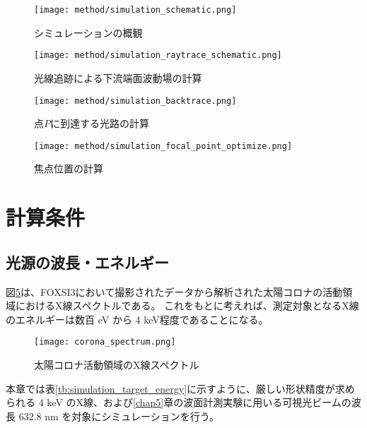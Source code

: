 \begin{figure}[h]
\centering
\texttt{[image: method/simulation\_schematic.png]}
\caption{シミュレーションの概観}
\label{fig:simulation_schematic}
\end{figure}


\begin{figure}[h]
\centering
\texttt{[image: method/simulation\_raytrace\_schematic.png]}
\caption{光線追跡による下流端面波動場の計算}
\label{fig:simulation_raytrace}
\end{figure}

\begin{figure}[h]
\centering
\texttt{[image: method/simulation\_backtrace.png]}
\caption{点$P$に到達する光路の計算}
\label{fig:simulation_backtrace}
\end{figure}

\begin{figure}[h]
\centering
\texttt{[image: method/simulation\_focal\_point\_optimize.png]}
\caption{焦点位置の計算}
\label{fig:simulation_focal_point_optimize}
\end{figure}



\clearpage
\newpage

\section{計算条件}
\label{chap2_simulation_condition}



\subsection{光源の波長・エネルギー}
\label{chap2_incident_beam_energy}

図\ref{fig:corona_spectrum}は、FOXSI3において撮影されたデータから解析された太陽コロナの活動領域におけるX線スペクトルである。\cite{2019AGUFMSH31C3315V}
これをもとに考えれば、測定対象となるX線のエネルギーは数百 eV から 4 keV程度であることになる。

\begin{figure}[ht]
\centering
\texttt{[image: corona\_spectrum.png]}
\caption{太陽コロナ活動領域のX線スペクトル\cite{2019AGUFMSH31C3315V}}
\label{fig:corona_spectrum}
\end{figure}

本章では表\ref{tb:simulation_target_energy}に示すように、厳しい形状精度が求められる 4 keV のX線、および\ref{chap5}章の波面計測実験に用いる可視光ビームの波長 632.8 nm を対象にシミュレーションを行う。

